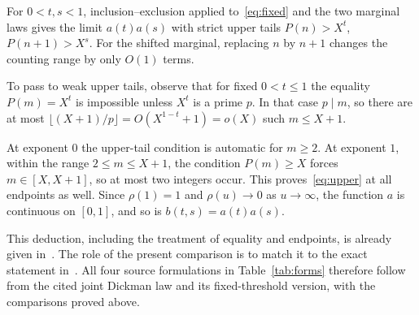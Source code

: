 \documentclass[11pt,a4paper]{amsart}
\begin{document}
For $0<t,s<1$, inclusion--exclusion applied to~\eqref{eq:fixed} and the
two marginal laws gives the limit $a(t)a(s)$ with strict upper tails
$P(n)>X^t$, $P(n+1)>X^s$. For the shifted marginal, replacing $n$ by
$n+1$ changes the counting range by only $O(1)$ terms.

To pass to weak upper tails, observe that for fixed $0<t\le1$ the
equality $P(m)=X^t$ is
impossible unless $X^t$ is a prime $p$. In that case $p\mid m$, so
there are at most $\lfloor(X+1)/p\rfloor=O(X^{1-t}+1)=o(X)$ such
$m\le X+1$.

At exponent $0$ the upper-tail condition is automatic for $m\ge2$.
At exponent $1$, within the range $2\le m\le X+1$, the condition
$P(m)\ge X$ forces $m\in[X,X+1]$, so at most two integers occur.
This proves~\eqref{eq:upper} at all
endpoints as well.
Since $\rho(1)=1$ and $\rho(u)\to0$ as $u\to\infty$, the function $a$
is continuous on $[0,1]$, and so is $b(t,s)=a(t)a(s)$.

This deduction, including the treatment of equality and endpoints, is
already given in~\cite[(11.8) and following paragraph, p.~80]{OpenAI2026}.
The role of the present comparison is to match it to the exact statement
in~\cite{ErdosPomerance1978}. All four source formulations in
Table~\ref{tab:forms} therefore follow from the cited joint Dickman law
and its fixed-threshold version, with the comparisons proved above.
\end{document}

